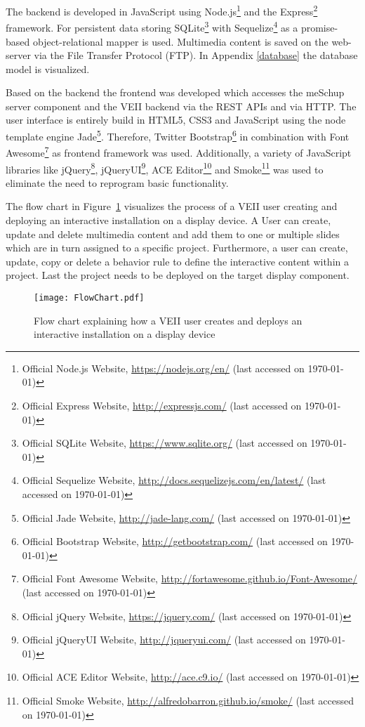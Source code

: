 The backend is developed in JavaScript using 
Node.js\footnote{Official Node.js Website, \url{https://nodejs.org/en/} (last accessed on \today)}
and the Express\footnote{Official Express Website, \url{http://expressjs.com/} (last accessed on \today)}
framework. 
For persistent data storing
SQLite\footnote{Official SQLite Website, \url{https://www.sqlite.org/} (last accessed on \today)} 
with Sequelize\footnote{Official Sequelize Website, \url{http://docs.sequelizejs.com/en/latest/} (last accessed on \today)} 
as a promise-based object-relational mapper is used. Multimedia content is saved on the web-server via the File Transfer Protocol (FTP). In Appendix \ref{database} the database model is visualized.

Based on the backend the frontend was developed which accesses the meSchup server component and the VEII backend via the REST APIs and via HTTP. The user interface is entirely build in HTML5, CSS3 and JavaScript using the node template engine Jade\footnote{Official Jade Website, \url{http://jade-lang.com/} (last accessed on \today)}. 
Therefore, Twitter 
Bootstrap\footnote{Official Bootstrap Website, \url{http://getbootstrap.com/} (last accessed on \today)} 
in combination with 
Font Awesome\footnote{Official Font Awesome Website, \url{http://fortawesome.github.io/Font-Awesome/} (last accessed on \today)}
as frontend framework was used. Additionally, a variety of JavaScript libraries like 
jQuery\footnote{Official jQuery Website, \url{https://jquery.com/} (last accessed on \today)}, 
jQueryUI\footnote{Official jQueryUI Website, \url{http://jqueryui.com/} (last accessed on \today)}, 
ACE Editor\footnote{Official ACE Editor Website, \url{http://ace.c9.io/} (last accessed on \today)}
and Smoke\footnote{Official Smoke Website, \url{http://alfredobarron.github.io/smoke/} (last accessed on \today)} was used to eliminate the need to reprogram basic functionality.
 
The flow chart in Figure~\ref{fig:flowchart} visualizes the process of a VEII user creating and deploying an interactive installation on a display device. A User can create, update and delete multimedia content and add them to one or multiple slides which are in turn assigned to a specific project. Furthermore, a user can create, update, copy or delete a behavior rule to define the interactive content within a project. Last the project needs to be deployed on the target display component. 

\begin{figure}
  \begin{center}
    \texttt{[image: FlowChart.pdf]}
    \caption{Flow chart explaining how a VEII user creates and deploys an interactive installation on a display device}
    \label{fig:flowchart}
  \end{center}
\end{figure}

